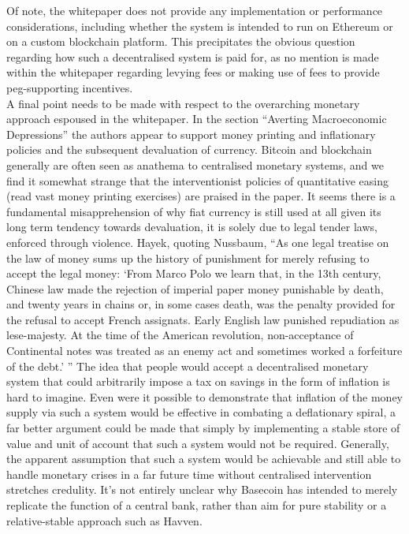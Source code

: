\noindent Of note, the whitepaper does not provide any implementation or performance considerations, including whether the system is intended to run on Ethereum or on a custom blockchain platform. This precipitates the obvious question regarding how such a decentralised system is paid for, as no mention is made within the whitepaper regarding levying fees or making use of fees to provide peg-supporting incentives. \\

\noindent A final point needs to be made with respect to the overarching monetary approach espoused in the whitepaper. In the section ``Averting Macroeconomic Depressions'' the authors appear to support money printing and inflationary policies and the subsequent devaluation of currency. Bitcoin and blockchain generally are often seen as anathema to centralised monetary systems, and we find it somewhat strange that the interventionist policies of quantitative easing (read vast money printing exercises) are praised in the paper. It seems there is a fundamental misapprehension of why fiat currency is still used at all given its long term tendency towards devaluation, it is solely due to legal tender laws, enforced through violence.  Hayek, quoting Nussbaum, ``As one legal treatise on the law of money sums up the history of punishment for merely refusing to accept the legal money: `From Marco Polo we learn that, in the 13th century, Chinese law made the rejection of imperial paper money punishable by death, and twenty years in chains or, in some cases death, was the penalty provided for the refusal to accept French assignats. Early English law punished repudiation as lese-majesty. At the time of the American revolution, non-acceptance of Continental notes was treated as an enemy act and sometimes worked a forfeiture of the debt.' '' The idea that people would accept a decentralised monetary system that could arbitrarily impose a tax on savings in the form of inflation is hard to imagine. Even were it possible to demonstrate that inflation of the money supply via such a system would be effective in combating a deflationary spiral, a far better argument could be made that simply by implementing a stable store of value and unit of account that such a system would not be required. Generally, the apparent assumption that such a system would be achievable and still able to handle monetary crises in a far future time without centralised intervention stretches credulity. It's not entirely unclear why Basecoin has intended to merely replicate the function of a central bank, rather than aim for pure stability or a relative-stable approach such as Havven. \\


